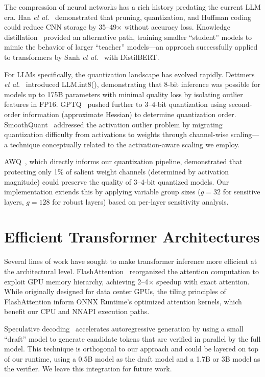 \documentclass[12pt, letterpaper, twoside]{report}
\newcommand{\etal}{\textit{et al.}\xspace}
\begin{document}
The compression of neural networks has a rich history predating the current LLM era. Han \etal~\cite{han2015deep} demonstrated that pruning, quantization, and Huffman coding could reduce CNN storage by 35--49$\times$ without accuracy loss. Knowledge distillation~\cite{hinton2015distilling} provided an alternative path, training smaller ``student'' models to mimic the behavior of larger ``teacher'' models---an approach successfully applied to transformers by Sanh \etal~\cite{sanh2019distilbert} with DistilBERT.

For LLMs specifically, the quantization landscape has evolved rapidly. Dettmers \etal~\cite{dettmers2022llmint8} introduced LLM.int8(), demonstrating that 8-bit inference was possible for models up to 175B parameters with minimal quality loss by isolating outlier features in FP16. GPTQ~\cite{frantar2022gptq} pushed further to 3--4-bit quantization using second-order information (approximate Hessian) to determine quantization order. SmoothQuant~\cite{xiao2023smoothquant} addressed the activation outlier problem by migrating quantization difficulty from activations to weights through channel-wise scaling---a technique conceptually related to the activation-aware scaling we employ.

AWQ~\cite{lin2024awq}, which directly informs our quantization pipeline, demonstrated that protecting only 1\% of salient weight channels (determined by activation magnitude) could preserve the quality of 3--4-bit quantized models. Our implementation extends this by applying variable group sizes ($g = 32$ for sensitive layers, $g = 128$ for robust layers) based on per-layer sensitivity analysis.

\section{Efficient Transformer Architectures}
\label{sec:related_efficient}

Several lines of work have sought to make transformer inference more efficient at the architectural level. FlashAttention~\cite{dao2022flashattention, dao2023flashattention2} reorganized the attention computation to exploit GPU memory hierarchy, achieving 2--4$\times$ speedup with exact attention. While originally designed for data center GPUs, the tiling principles of FlashAttention inform ONNX Runtime's optimized attention kernels, which benefit our CPU and NNAPI execution paths.

Speculative decoding~\cite{leviathan2023fast, chen2023accelerating} accelerates autoregressive generation by using a small ``draft'' model to generate candidate tokens that are verified in parallel by the full model. This technique is orthogonal to our approach and could be layered on top of our runtime, using a 0.5B model as the draft model and a 1.7B or 3B model as the verifier. We leave this integration for future work.
\end{document}
